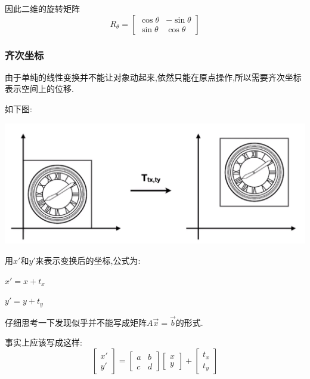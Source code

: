 \documentclass[UTF8,12pt]{ctexbook}
\begin{document}
{{{      因此二维的旋转矩阵$$
        R_\theta = \begin{bmatrix}
          \cos\theta & -\sin\theta \\
          \sin\theta & \cos\theta
        \end{bmatrix}
      $$


      \subsubsection{齐次坐标}{
        由于单纯的线性变换并不能让对象动起来,依然只能在原点操作,所以需要齐次坐标表示空间上的位移.

        如下图:

        \includegraphics[scale=0.25]{resources/homogeneous_coordinates.png}

        用$x\prime$和$y\prime$来表示变换后的坐标,公式为:

        $x\prime = x + t_x$

        $y\prime = y + t_y$

        仔细思考一下发现似乎并不能写成矩阵$A\vec{x} = \vec{b}$的形式.

        事实上应该写成这样:
        $$
          \begin{bmatrix}
            x\prime \\
            y\prime
          \end{bmatrix}
          =
          \begin{bmatrix}
            a & b \\
            c & d
          \end{bmatrix}
          \begin{bmatrix}
            x \\
            y
          \end{bmatrix}
          +
          \begin{bmatrix}
            t_x \\
            t_y
          \end{bmatrix}
        $$

}}}}
\end{document}
